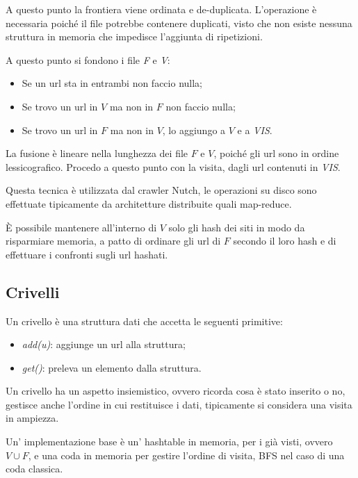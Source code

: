 A questo punto la frontiera viene ordinata e de-duplicata. 
L'operazione è necessaria poiché il file potrebbe contenere duplicati, 
visto che non esiste nessuna struttura 
in memoria che impedisce l'aggiunta di ripetizioni.

A questo punto si fondono i file \emph{F} e \emph{V}: 
\begin{itemize}
    \item Se un url sta in entrambi non faccio nulla;
    \item Se trovo un url in $V$ ma non in $F$ non faccio nulla;
    \item Se trovo un url in $F$ ma non in $V$, lo aggiungo a $V$ e 
    a \emph{VIS}.
\end{itemize}
La fusione è lineare nella lunghezza dei file $F$ e $V$, poiché gli url sono in ordine lessicografico.
Procedo a questo punto con la visita, dagli url contenuti in \emph{VIS}.
\begin{remark}
    Questa tecnica è utilizzata dal crawler Nutch, le operazioni su disco 
    sono effettuate tipicamente da architetture distribuite quali map-reduce.
\end{remark}
\begin{remark}
    È possibile mantenere all'interno di $V$ solo gli hash dei siti 
    in modo da risparmiare memoria, a patto di ordinare gli url di $F$ secondo il 
    loro hash e di effettuare i confronti sugli url hashati.
\end{remark}

\subsection{Crivelli}

Un crivello è una struttura dati che accetta le seguenti primitive: 
\begin{itemize}
    \item \emph{add(u)}: aggiunge un url alla struttura;
    \item \emph{get()}: preleva un elemento dalla struttura. 
\end{itemize}
Un crivello ha un aspetto insiemistico, ovvero ricorda cosa è stato inserito 
o no, gestisce anche l'ordine in cui restituisce i dati, tipicamente 
si considera una visita in ampiezza. 

Un' implementazione base è un' hashtable in memoria, per i già visti, ovvero $V \cup F$, 
e una coda in memoria per gestire l'ordine di visita, BFS nel caso di una coda classica.

